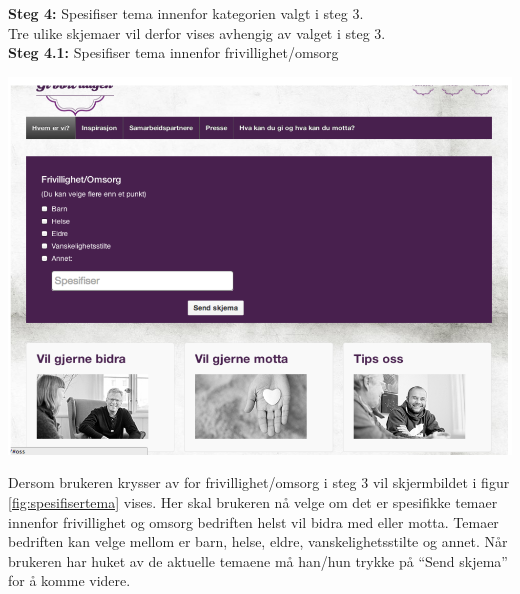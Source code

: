 {\bf Steg 4:} Spesifiser tema innenfor kategorien valgt i steg 3.\\
Tre ulike skjemaer vil derfor vises avhengig av valget i steg 3.\\

{\bf Steg 4.1:} Spesifiser tema innenfor frivillighet/omsorg
\begin{center}
\includegraphics[clip=true, width=1 \textwidth,
trim=0cm 0cm 0cm 0cm]{spesifisertema.png}
\label{fig:spesifisertema}
\end{center}

Dersom brukeren krysser av for frivillighet/omsorg i steg 3 vil skjermbildet i figur \ref{fig:spesifisertema} vises. Her skal brukeren nå velge om det er spesifikke temaer innenfor frivillighet og omsorg bedriften helst vil bidra med eller motta. Temaer bedriften kan velge mellom er barn, helse, eldre, vanskelighetsstilte og annet. Når brukeren har huket av de aktuelle temaene må han/hun trykke på “Send skjema” for å komme videre.\\

